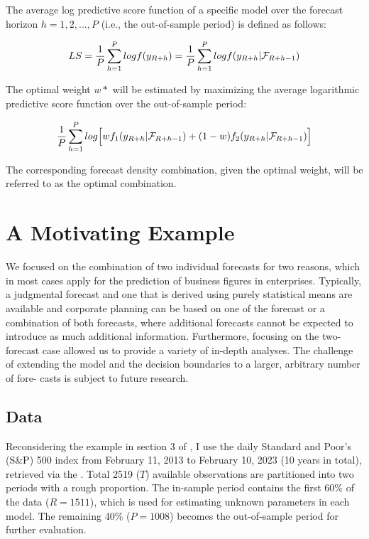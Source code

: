 \documentclass{monashthesis}
\begin{document}
The average log predictive score function of a specific model over the forecast horizon \(h=1,2,...,P\) (i.e., the out-of-sample period) is defined as follows:

\begin{equation}
LS = \frac{1}{P}\sum^P_{h=1}logf(y_{\small{R+h}}) = \frac{1}{P}\sum^P_{h=1} logf(y_{\small{R+h}}| \mathcal{F}_{\small{R+h-1}})
\end{equation}

The optimal weight \(w*\) will be estimated by maximizing the average logarithmic predictive score function over the out-of-sample period:

\begin{equation}
\frac{1}{P}\sum^P_{h=1}log\Big[wf_1(y_{\small{R+h}}|\mathcal{F}_{\small{R+h-1}}) + (1-w)f_2(y_{\small{R+h}}|\mathcal{F}_{\small{R+h-1}})\Big]
\end{equation}

The corresponding forecast density combination, given the optimal weight, will be referred to as the optimal combination.

\hypertarget{a-motivating-example}{%
\section{A Motivating Example}\label{a-motivating-example}}

We focused on the combination of two individual forecasts for two reasons, which in most cases apply for the prediction of business figures in enterprises. Typically, a judgmental forecast and one that is derived using purely statistical means are available and corporate planning can be based on one of the forecast or a combination of both forecasts, where additional forecasts cannot be expected to introduce as much additional information. Furthermore, focusing on the two-forecast case allowed us to provide a variety of in-depth analyses. The challenge of extending the model and the decision boundaries to a larger, arbitrary number of fore- casts is subject to future research.

\hypertarget{data}{%
\subsection{Data}\label{data}}

Reconsidering the example in section 3 of \textcite{GA11}, I use the daily Standard and Poor's (S\&P) 500 index from February 11, 2013 to February 10, 2023 (10 years in total), retrieved via the \textcite{SP500}. Total 2519 (\(T\)) available observations are partitioned into two periods with a rough proportion. The in-sample period contains the first 60\% of the data (\(R = 1511\)), which is used for estimating unknown parameters in each model. The remaining 40\% (\(P = 1008\)) becomes the out-of-sample period for further evaluation.
\end{document}
